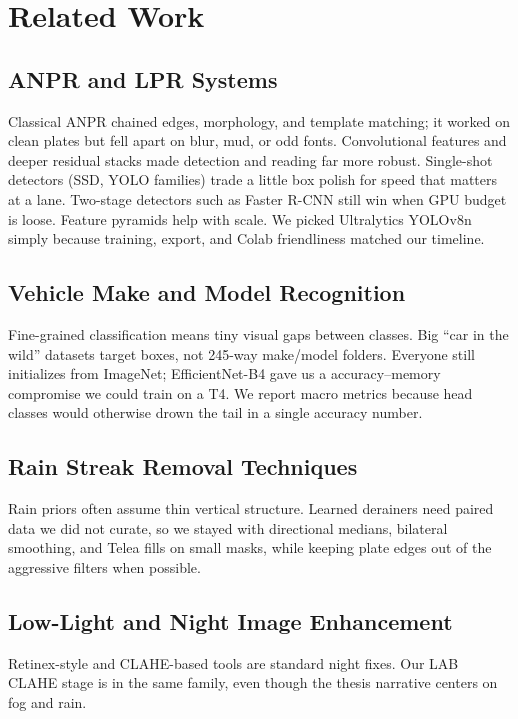 \documentclass[10pt, conference]{IEEEtran}
\begin{document}
\section{Related Work}
\label{sec:related}

\subsection{ANPR and LPR Systems}
Classical ANPR chained edges, morphology, and template matching; it worked on clean plates but fell apart on blur, mud, or odd fonts. Convolutional features and deeper residual stacks made detection and reading far more robust. Single-shot detectors (SSD, YOLO families) trade a little box polish for speed that matters at a lane. Two-stage detectors such as Faster R-CNN still win when GPU budget is loose. Feature pyramids help with scale. We picked Ultralytics YOLOv8n simply because training, export, and Colab friendliness matched our timeline.

\subsection{Vehicle Make and Model Recognition}
Fine-grained classification means tiny visual gaps between classes. Big ``car in the wild'' datasets target boxes, not 245-way make/model folders. Everyone still initializes from ImageNet; EfficientNet-B4 gave us a accuracy--memory compromise we could train on a T4. We report macro metrics because head classes would otherwise drown the tail in a single accuracy number.

\subsection{Rain Streak Removal Techniques}
Rain priors often assume thin vertical structure. Learned derainers need paired data we did not curate, so we stayed with directional medians, bilateral smoothing, and Telea fills on small masks, while keeping plate edges out of the aggressive filters when possible.

\subsection{Low-Light and Night Image Enhancement}
Retinex-style and CLAHE-based tools are standard night fixes. Our LAB CLAHE stage is in the same family, even though the thesis narrative centers on fog and rain.
\end{document}

